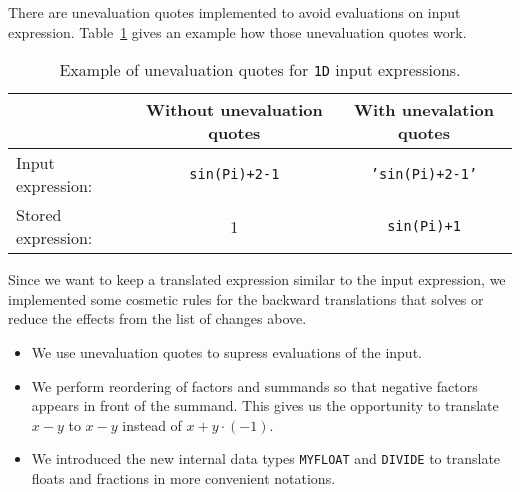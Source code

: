 There are unevaluation quotes implemented to avoid evaluations on input expression. Table~\ref{tab:unevaluation-quotes} gives an example how those unevaluation quotes work.

\begin{table}[ht]
\centering
\begin{tabular}{lcc}
\hline
& Without unevaluation quotes & With unevalation quotes\\
\hline
Input expression: & \texttt{sin(Pi)+2-1} & \texttt{'sin(Pi)+2-1'}\\
Stored expression: & 1 & \texttt{sin(Pi)+1}\\
\hline
\end{tabular}
\caption{Example of unevaluation quotes for \texttt{1D} \Maple{} input expressions.}
\label{tab:unevaluation-quotes}
\end{table}

Since we want to keep a translated expression similar to the input expression, we implemented some cosmetic rules for the backward translations that solves or reduce the effects from the list of changes above. 
\begin{itemize}
\item We use unevaluation quotes to supress evaluations of the input.
\item We perform reordering of factors and summands so that negative factors appears in front of the summand. This gives us the opportunity to translate $x - y$ to $x - y$ instead of $x + y \cdot (-1)$.
\item We introduced the new internal data types \texttt{MYFLOAT} and \texttt{DIVIDE} to translate floats and fractions in more convenient notations.
\end{itemize}



